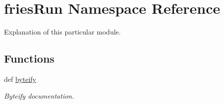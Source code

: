\hypertarget{namespacefriesRun}{\section{fries\-Run Namespace Reference}
\label{namespacefriesRun}
}


Explanation of this particular module.  


\subsection*{Functions}
\begin{DoxyCompactItemize}
\item 
def \hyperlink{namespacefriesRun_adc75a75ab53e818261aacac9e6b28f41}{byteify}
\begin{DoxyCompactList}\small\item\em Byteify documentation. \end{DoxyCompactList}\end{DoxyCompactItemize}
